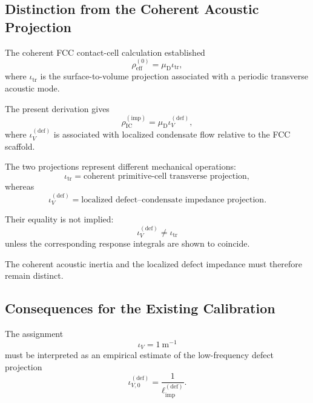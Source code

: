 \subsection{Distinction from the Coherent Acoustic Projection}

The coherent FCC contact-cell calculation established
\begin{equation}
    \rho_{\mathrm{eff}}^{(0)} = \mu_{\mathrm{D}}\iota_{\mathrm{tr}},
\end{equation}
where $\iota_{\mathrm{tr}}$ is the surface-to-volume projection associated with a periodic transverse acoustic mode.

The present derivation gives
\begin{equation}
    \rho_{\mathrm{IC}}^{(\mathrm{imp})} = \mu_{\mathrm{D}}\iota_V^{(\mathrm{def})},
\end{equation}
where $\iota_V^{(\mathrm{def})}$ is associated with localized condensate flow relative to the FCC scaffold.

The two projections represent different mechanical operations:
\begin{equation}
    \boxed{ \iota_{\mathrm{tr}} = \text{coherent primitive-cell transverse projection} },
\end{equation}
whereas
\begin{equation}
    \boxed{ \iota_V^{(\mathrm{def})} = \text{localized defect--condensate impedance projection} }.
\end{equation}

Their equality is not implied:
\begin{equation}
    \boxed{ \iota_V^{(\mathrm{def})} \neq \iota_{\mathrm{tr}} }
\end{equation}
unless the corresponding response integrals are shown to coincide.

The coherent acoustic inertia and the localized defect impedance must therefore remain distinct.

\subsection{Consequences for the Existing Calibration}

The assignment
\begin{equation}
    \iota_V = 1 \ \mathrm{m}^{-1}
\end{equation}
must be interpreted as an empirical estimate of the low-frequency defect projection
\begin{equation}
    \iota_{V,0}^{(\mathrm{def})} = \frac{1}{ \ell_{\mathrm{imp}}^{(\mathrm{def})} }.
\end{equation}

